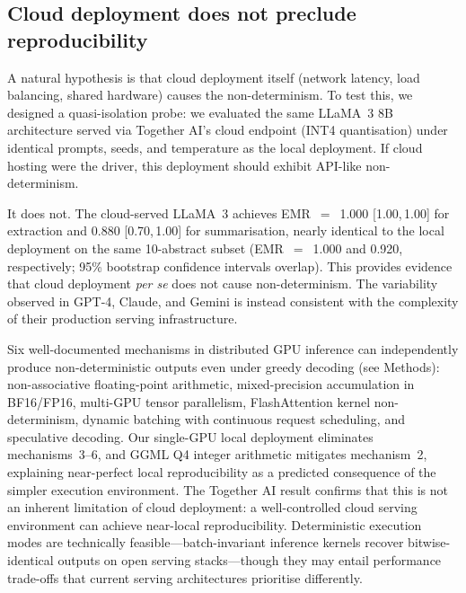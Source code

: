 \documentclass[sn-nature]{sn-jnl}
\begin{document}
\subsection{Cloud deployment does not preclude reproducibility}\label{subsec:cloud}

A natural hypothesis is that cloud deployment itself (network latency, load balancing, shared hardware) causes the non-determinism.
To test this, we designed a quasi-isolation probe: we evaluated the same LLaMA~3 8B architecture served via Together AI's cloud endpoint (INT4 quantisation) under identical prompts, seeds, and temperature as the local deployment.
If cloud hosting were the driver, this deployment should exhibit API-like non-determinism.

It does not.
The cloud-served LLaMA~3 achieves EMR~$=$~1.000 [1.00,\,1.00] for extraction and 0.880 [0.70,\,1.00] for summarisation, nearly identical to the local deployment on the same 10-abstract subset (EMR~$=$~1.000 and 0.920, respectively; 95\% bootstrap confidence intervals overlap).
This provides evidence that cloud deployment \emph{per se} does not cause non-determinism. The variability observed in GPT-4, Claude, and Gemini is instead consistent with the complexity of their production serving infrastructure.

Six well-documented mechanisms in distributed GPU inference can independently produce non-deterministic outputs even under greedy decoding (see Methods): non-associative floating-point arithmetic\cite{higham2002accuracy}, mixed-precision accumulation in BF16/FP16\cite{yuan2025nondeterminism}, multi-GPU tensor parallelism\cite{shoeybi2019megatron}, FlashAttention kernel non-determinism\cite{dao2022flashattention}, dynamic batching with continuous request scheduling\cite{kwon2023vllm}, and speculative decoding\cite{leviathan2023speculative}.
Our single-GPU local deployment eliminates mechanisms~3--6, and GGML Q4 integer arithmetic mitigates mechanism~2, explaining near-perfect local reproducibility as a predicted consequence of the simpler execution environment.
The Together AI result confirms that this is not an inherent limitation of cloud deployment: a well-controlled cloud serving environment can achieve near-local reproducibility.
Deterministic execution modes are technically feasible---batch-invariant inference kernels recover bitwise-identical outputs on open serving stacks\cite{he2025nondeterminism}---though they may entail performance trade-offs that current serving architectures prioritise differently.
\end{document}
